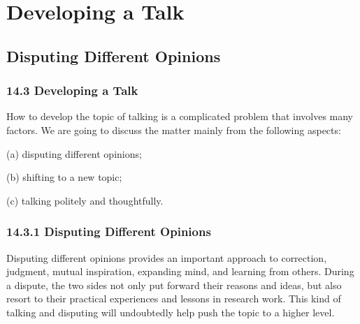\documentclass[aspectratio=169,UTF8,c]{beamer}%
\begin{document}
\section{Developing a Talk}

\subsection{Disputing Different Opinions}
\begin{frame}
	\frametitle{14.3 Developing a Talk}
	How to develop the topic of talking is a complicated problem that involves many factors. We are going to discuss the matter mainly from the following aspects: 
	
	(a) disputing different opinions; 
	
	(b) shifting to a new topic; 
	
	(c) talking politely and thoughtfully.
\end{frame}

\begin{frame}
	\frametitle{14.3.1 Disputing Different Opinions}
	Disputing different opinions provides an important approach to correction, judgment, mutual inspiration, expanding mind, and learning from others. During a dispute, the two sides not only put forward their reasons and ideas, but also resort to their practical experiences and lessons in research work. This kind of talking and disputing will undoubtedly help push the topic to a higher level.
\end{frame}
\end{document}
